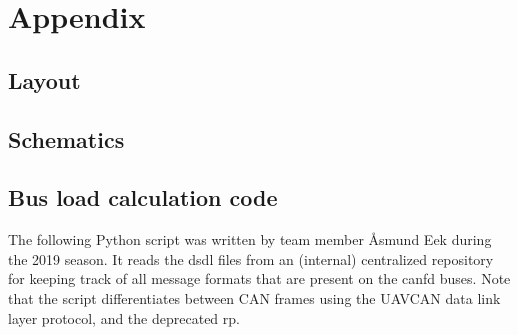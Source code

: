 \section*{Appendix}

\subsection*{Layout}

\subsection*{Schematics}

\subsection*{Bus load calculation code}

The  following Python script was written by team member Åsmund Eek during the 2019 season. It reads the \acrshort{dsdl} files from an (internal) centralized repository for keeping track of all message formats that are present on the \acrshort{canfd} buses. Note that the script differentiates between CAN frames using the UAVCAN data link layer protocol, and the deprecated \acrfull{rp}.



